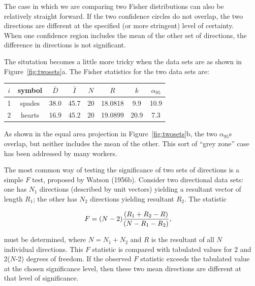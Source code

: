 The case in which we are comparing  two Fisher distributions  can also be
relatively straight forward. 
If the two confidence circles do not overlap, the two directions are 
different at the specified (or more stringent) level of certainty.  When one confidence region includes
the mean of the other set of directions, the difference in directions is not
significant.  

The situtation becomes a little more tricky when the data sets are as shown in Figure~\ref{fig:twosets}a.  The Fisher statistics for the two data sets are:

\vskip 6pt
\begin{center}
\begin{tabular}{cccccccc}
\hline
$i$ & symbol& $\bar D$ & $\bar I$ & $N$ & $R$ & $k$&$\alpha_{95}$\\
\hline 
1&spades&  38.0&   45.7  &   20  & 18.0818    &  9.9   &10.9\\
2 & hearts&   16.9   &45.2   &  20 &  19.0899&     20.9  &  7.3\\
\hline
\end{tabular}
\end{center}

As shown in the equal area projection in Figure~\ref{fig:twosets}b, the two $\alpha_{95}$s overlap, but neither includes
the mean of the other. This sort of
``grey zone'' case  has been  addressed by many workers. 


The most common  way of testing the significance of two sets of directions is a simple 
$F$ test, proposed by 
Watson (1956b).  \nocite{watson56b}
Consider two directional data sets: one has $N_1$ directions (described by unit vectors) yielding a resultant
vector of length $R_1$; the other has $N_2$ directions yielding resultant $R_2$. The statistic

\begin{equation}
F = {(N - 2)} {{(R_1 + R_2 - R)}  \over {(N - R_1 - R_2 )} },
\label{eq:twoF}
\end{equation}

\noindent must be determined, where
$N = N_1 + N_2$
and $R$ is the resultant of all $N$ individual directions. This $F$ statistic is compared with tabulated values for 2
and 2($N$-2) degrees of freedom. If the observed $F$ statistic exceeds the tabulated value at the chosen
significance level, then these two mean directions are different at that level of significance.

